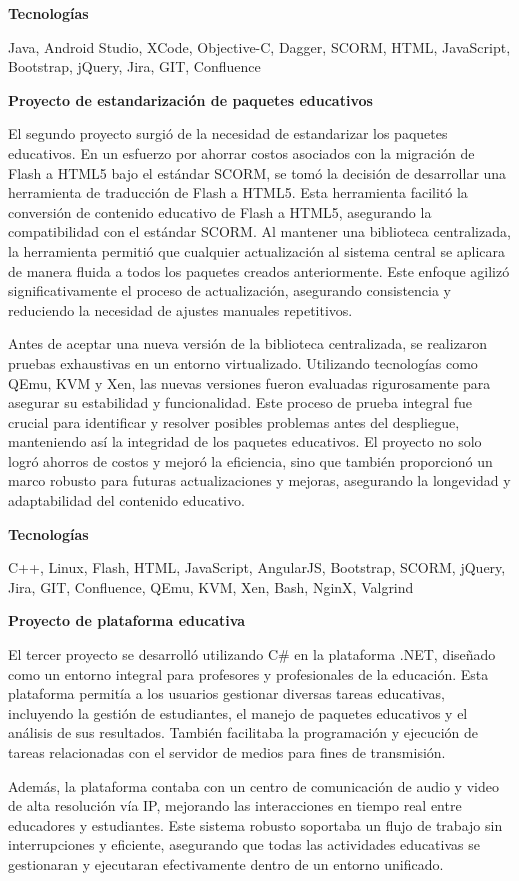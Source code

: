 \documentclass[a4paper,10pt]{article}
\newcommand{\cvsubsubsection}[1]{
\begin{tcolorbox}[colback=gray!10, colframe=gray!10, boxrule=0pt, arc=0mm, outer arc=0mm, width=\textwidth, boxsep=0pt, left=4mm, right=4mm, top=1mm, bottom=1mm]
  \textbf{#1}
\end{tcolorbox}
\vspace{1mm}
}
\newcommand{\cvsubsubsubsection}[1]{
  \begin{tcolorbox}[colback=gray!5, colframe=gray!5, boxrule=0pt, arc=0mm, outer arc=0mm, width=\textwidth, boxsep=0pt, left=6mm, right=6mm, top=1mm, bottom=1mm]
    \textbf{#1}
  \end{tcolorbox}
  \vspace{1mm}
}
\begin{document}
\cvsubsubsubsection{Tecnologías}
Java, Android Studio, XCode, Objective-C, Dagger, SCORM, HTML, JavaScript, Bootstrap, jQuery, Jira, GIT, Confluence

\cvsubsubsection{Proyecto de estandarización de paquetes educativos}
El segundo proyecto surgió de la necesidad de estandarizar los paquetes educativos. En un esfuerzo por ahorrar costos asociados con la migración de Flash a HTML5 bajo el estándar SCORM, se tomó la decisión de desarrollar una herramienta de traducción de Flash a HTML5. Esta herramienta facilitó la conversión de contenido educativo de Flash a HTML5, asegurando la compatibilidad con el estándar SCORM. Al mantener una biblioteca centralizada, la herramienta permitió que cualquier actualización al sistema central se aplicara de manera fluida a todos los paquetes creados anteriormente. Este enfoque agilizó significativamente el proceso de actualización, asegurando consistencia y reduciendo la necesidad de ajustes manuales repetitivos.

Antes de aceptar una nueva versión de la biblioteca centralizada, se realizaron pruebas exhaustivas en un entorno virtualizado. Utilizando tecnologías como QEmu, KVM y Xen, las nuevas versiones fueron evaluadas rigurosamente para asegurar su estabilidad y funcionalidad. Este proceso de prueba integral fue crucial para identificar y resolver posibles problemas antes del despliegue, manteniendo así la integridad de los paquetes educativos. El proyecto no solo logró ahorros de costos y mejoró la eficiencia, sino que también proporcionó un marco robusto para futuras actualizaciones y mejoras, asegurando la longevidad y adaptabilidad del contenido educativo.

\cvsubsubsubsection{Tecnologías}
C++, Linux, Flash, HTML, JavaScript, AngularJS, Bootstrap, SCORM, jQuery, Jira, GIT, Confluence, QEmu, KVM, Xen, Bash, NginX, Valgrind

\cvsubsubsection{Proyecto de plataforma educativa}
El tercer proyecto se desarrolló utilizando C\# en la plataforma .NET, diseñado como un entorno integral para profesores y profesionales de la educación. Esta plataforma permitía a los usuarios gestionar diversas tareas educativas, incluyendo la gestión de estudiantes, el manejo de paquetes educativos y el análisis de sus resultados. También facilitaba la programación y ejecución de tareas relacionadas con el servidor de medios para fines de transmisión.

Además, la plataforma contaba con un centro de comunicación de audio y video de alta resolución vía IP, mejorando las interacciones en tiempo real entre educadores y estudiantes. Este sistema robusto soportaba un flujo de trabajo sin interrupciones y eficiente, asegurando que todas las actividades educativas se gestionaran y ejecutaran efectivamente dentro de un entorno unificado.
\end{document}
